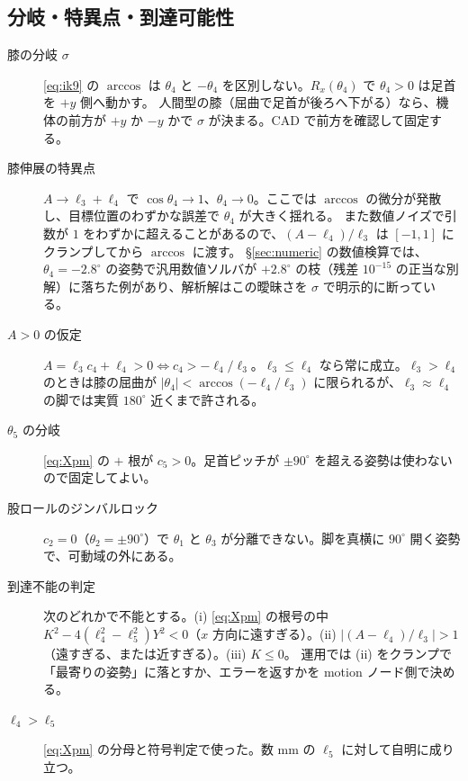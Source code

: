 \documentclass[a4paper,11pt]{ltjsarticle}
\newcommand{\Rx}{R_x}\newcommand{\Ry}{R_y}\newcommand{\Rz}{R_z}
\newcommand{\cs}[1]{c_{#1}}\newcommand{\sn}[1]{s_{#1}}
\begin{document}
\subsection{分岐・特異点・到達可能性}\label{sec:branch}
\begin{description}
\item[膝の分岐 $\sigma$] \eqref{eq:ik9} の $\arccos$ は $\theta_4$ と $-\theta_4$ を区別しない。$\Rx(\theta_4)$ で $\theta_4>0$ は足首を $+y$ 側へ動かす。
人間型の膝（屈曲で足首が後ろへ下がる）なら、機体の前方が $+y$ か $-y$ かで $\sigma$ が決まる。CAD で前方を確認して固定する。
\item[膝伸展の特異点] $A\to\ell_3+\ell_4$ で $\cos\theta_4\to1$、$\theta_4\to0$。ここでは $\arccos$ の微分が発散し、目標位置のわずかな誤差で $\theta_4$ が大きく揺れる。
また数値ノイズで引数が $1$ をわずかに超えることがあるので、$(A-\ell_4)/\ell_3$ は $[-1,1]$ にクランプしてから $\arccos$ に渡す。
\S\ref{sec:numeric} の数値検算では、$\theta_4=-2.8^\circ$ の姿勢で汎用数値ソルバが $+2.8^\circ$ の枝（残差 $10^{-15}$ の正当な別解）に落ちた例があり、解析解はこの曖昧さを $\sigma$ で明示的に断っている。
\item[$A>0$ の仮定] $A=\ell_3\cs4+\ell_4>0\Leftrightarrow\cs4>-\ell_4/\ell_3$。$\ell_3\le\ell_4$ なら常に成立。$\ell_3>\ell_4$ のときは膝の屈曲が $|\theta_4|<\arccos(-\ell_4/\ell_3)$ に限られるが、$\ell_3\approx\ell_4$ の脚では実質 $180^\circ$ 近くまで許される。
\item[$\theta_5$ の分岐] \eqref{eq:Xpm} の $+$ 根が $\cs5>0$。足首ピッチが $\pm90^\circ$ を超える姿勢は使わないので固定してよい。
\item[股ロールのジンバルロック] $\cs2=0$（$\theta_2=\pm90^\circ$）で $\theta_1$ と $\theta_3$ が分離できない。脚を真横に $90^\circ$ 開く姿勢で、可動域の外にある。
\item[到達不能の判定] 次のどれかで不能とする。(i) \eqref{eq:Xpm} の根号の中 $K^2-4(\ell_4^2-\ell_5^2)Y^2<0$（$x$ 方向に遠すぎる）。(ii) $|(A-\ell_4)/\ell_3|>1$（遠すぎる、または近すぎる）。(iii) $K\le0$。
運用では (ii) をクランプで「最寄りの姿勢」に落とすか、エラーを返すかを motion ノード側で決める。
\item[$\ell_4>\ell_5$] \eqref{eq:Xpm} の分母と符号判定で使った。数 mm の $\ell_5$ に対して自明に成り立つ。
\end{description}
\end{document}
